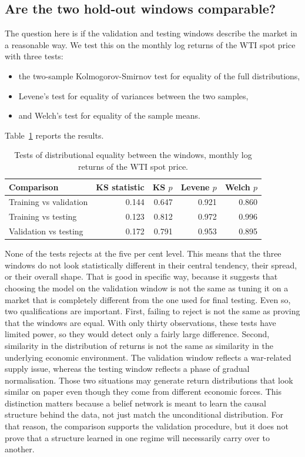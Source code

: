 \documentclass[11pt,a4paper]{article}
\begin{document}
\subsection{Are the two hold-out windows comparable?}

The question here is if the validation and testing windows describe the market in a reasonable way.
 We test this on the monthly log returns of the WTI spot
price with three tests:
\begin{itemize}
    \item the two-sample Kolmogorov-Smirnov test for equality of the full distributions,
    \item Levene's test for equality of variances between the two samples,
    \item and Welch's test for equality of the sample means.
\end{itemize}
Table~\ref{tab:ks} reports the results.

\begin{table}[H]
\centering
\caption{Tests of distributional equality between the windows, monthly log returns of the WTI spot
price.}
\label{tab:ks}
\begin{tabular}{@{}lrrrr@{}}
\toprule
\textbf{Comparison} & \textbf{KS statistic} & \textbf{KS $p$} & \textbf{Levene $p$} &
\textbf{Welch $p$} \\
\midrule
Training vs validation & 0.144 & 0.647 & 0.921 & 0.860 \\
Training vs testing    & 0.123 & 0.812 & 0.972 & 0.996 \\
Validation vs testing  & 0.172 & 0.791 & 0.953 & 0.895 \\
\bottomrule
\end{tabular}
\end{table}

None of the tests rejects at the five per cent level. This means that the three
windows do not look statistically different in their central tendency, their spread, or their overall
shape. That is good in specific way, because it suggests that choosing the model on the 
validation window is not the same as tuning it on a market that is completely different 
from the one used for final testing. Even so, two qualifications are important. First, 
failing to reject is not the same as proving that the windows are equal. With only 
thirty observations, these tests have limited power, so they would detect only a 
fairly large difference. Second, similarity in the distribution of returns is not 
the same as similarity in the underlying economic environment. The validation
window reflects a war-related supply issue, whereas the testing window reflects a phase of
gradual normalisation. Those two situations may generate return distributions 
that look similar on paper even though they come from different economic forces. 
This distinction matters because a belief network is meant to learn the causal 
structure behind the data, not just match the unconditional distribution. For 
that reason, the comparison supports the validation procedure, but it does not 
prove that a structure learned in one regime will necessarily carry over to another.
\end{document}
